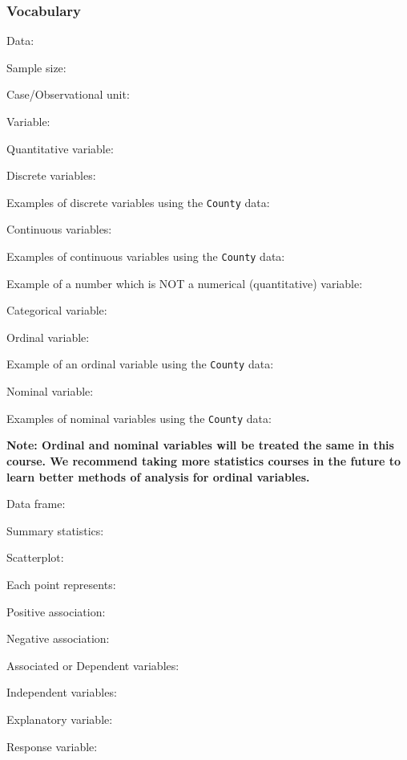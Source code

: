 \documentclass[
]{report}
\newcommand{\rgs}{\vspace{12pt}} %
\newcommand{\rgi}{\hspace{24pt}}  %
\begin{document}

\hypertarget{vocabulary}{%
\subsubsection*{Vocabulary}\label{vocabulary}}

Data:
\rgs

Sample size:
\rgs

Case/Observational unit:
\rgs

Variable:
\rgs

\rgi Quantitative variable:
\rgs

\rgi Discrete variables:
\rgs

\rgi \rgi Examples of discrete variables using the \texttt{County} data:
\rgs

\rgi Continuous variables:
\rgs

\rgi \rgi Examples of continuous variables using the \texttt{County} data:
\rgs

Example of a number which is NOT a numerical (quantitative) variable:
\rgs

\newpage

Categorical variable:
\rgs

\rgi Ordinal variable:
\rgs

\rgi \rgi Example of an ordinal variable using the \texttt{County} data:
\rgs

\rgi Nominal variable:
\rgs

\rgi \rgi Examples of nominal variables using the \texttt{County} data:

\rgs

\textbf{Note: Ordinal and nominal variables will be treated the same in this course. We recommend taking more statistics courses in the future to learn better methods of analysis for ordinal variables.}

Data frame:
\rgs

Summary statistics:
\rgs

Scatterplot:
\rgs

\rgi Each point represents:

\rgi Positive association:

\rgi Negative association:

Associated or Dependent variables:
\rgs

Independent variables:
\rgs

Explanatory variable:
\rgs

Response variable:
\rgs
\end{document}

